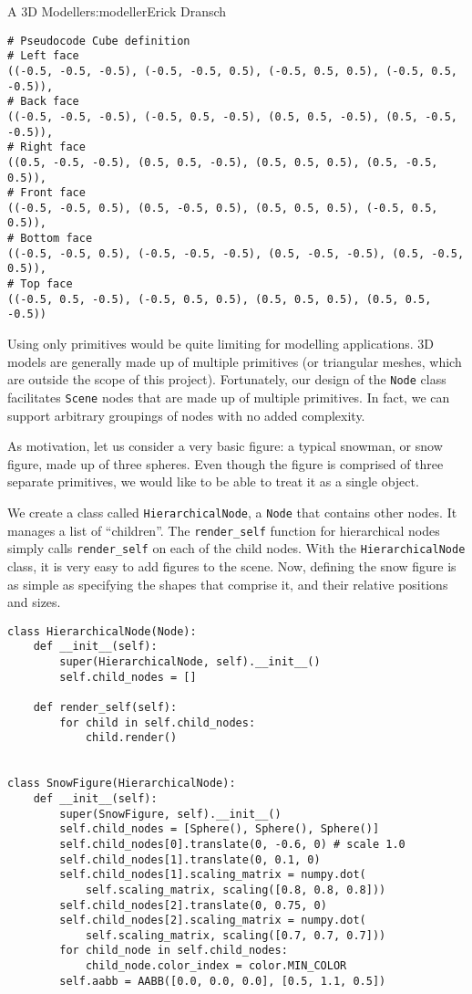 \begin{aosachapter}{A 3D Modeller}{s:modeller}{Erick Dransch}
\begin{verbatim}
# Pseudocode Cube definition
# Left face
((-0.5, -0.5, -0.5), (-0.5, -0.5, 0.5), (-0.5, 0.5, 0.5), (-0.5, 0.5, -0.5)),
# Back face
((-0.5, -0.5, -0.5), (-0.5, 0.5, -0.5), (0.5, 0.5, -0.5), (0.5, -0.5, -0.5)),
# Right face
((0.5, -0.5, -0.5), (0.5, 0.5, -0.5), (0.5, 0.5, 0.5), (0.5, -0.5, 0.5)),
# Front face
((-0.5, -0.5, 0.5), (0.5, -0.5, 0.5), (0.5, 0.5, 0.5), (-0.5, 0.5, 0.5)),
# Bottom face
((-0.5, -0.5, 0.5), (-0.5, -0.5, -0.5), (0.5, -0.5, -0.5), (0.5, -0.5, 0.5)),
# Top face
((-0.5, 0.5, -0.5), (-0.5, 0.5, 0.5), (0.5, 0.5, 0.5), (0.5, 0.5, -0.5))
\end{verbatim}

Using only primitives would be quite limiting for modelling
applications. 3D models are generally made up of multiple primitives (or
triangular meshes, which are outside the scope of this project).
Fortunately, our design of the \texttt{Node} class facilitates
\texttt{Scene} nodes that are made up of multiple primitives. In fact,
we can support arbitrary groupings of nodes with no added complexity.

As motivation, let us consider a very basic figure: a typical snowman,
or snow figure, made up of three spheres. Even though the figure is
comprised of three separate primitives, we would like to be able to
treat it as a single object.

We create a class called \texttt{HierarchicalNode}, a \texttt{Node} that
contains other nodes. It manages a list of ``children''. The
\texttt{render\_self} function for hierarchical nodes simply calls
\texttt{render\_self} on each of the child nodes. With the
\texttt{HierarchicalNode} class, it is very easy to add figures to the
scene. Now, defining the snow figure is as simple as specifying the
shapes that comprise it, and their relative positions and sizes.


\begin{verbatim}
class HierarchicalNode(Node):
    def __init__(self):
        super(HierarchicalNode, self).__init__()
        self.child_nodes = []

    def render_self(self):
        for child in self.child_nodes:
            child.render()


class SnowFigure(HierarchicalNode):
    def __init__(self):
        super(SnowFigure, self).__init__()
        self.child_nodes = [Sphere(), Sphere(), Sphere()]
        self.child_nodes[0].translate(0, -0.6, 0) # scale 1.0
        self.child_nodes[1].translate(0, 0.1, 0)
        self.child_nodes[1].scaling_matrix = numpy.dot(
            self.scaling_matrix, scaling([0.8, 0.8, 0.8]))
        self.child_nodes[2].translate(0, 0.75, 0)
        self.child_nodes[2].scaling_matrix = numpy.dot(
            self.scaling_matrix, scaling([0.7, 0.7, 0.7]))
        for child_node in self.child_nodes:
            child_node.color_index = color.MIN_COLOR
        self.aabb = AABB([0.0, 0.0, 0.0], [0.5, 1.1, 0.5])
\end{verbatim}


\end{aosachapter}
